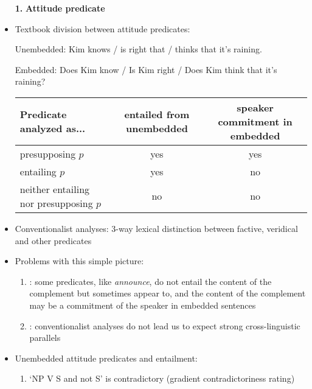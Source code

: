 \documentclass[11pt,fleqn]{article}
\newcommand{\6}{\mbox{$[\hspace*{-.6mm}[$}}
\newcommand{\9}{\mbox{$]\hspace*{-.6mm}]$}}
\begin{document}
\begin{itemize}[leftmargin=3ex,topsep=0pt,itemsep=-2pt]
\newpage

\item[{\bf 1.}] {\bf Attitude predicate}

\item Textbook division between attitude predicates:

\begin{exe}
\ex
\begin{xlist}
\ex Unembedded: Kim knows / is right that / thinks that it's raining.

\ex Embedded: Does Kim know / Is Kim right / Does Kim think that it's raining? 

\end{xlist}
\end{exe}

\begin{tabular}{l|cc}
Predicate analyzed as... & entailed from unembedded & speaker commitment in embedded \\ \hline
presupposing $p$ & yes & yes \\
entailing $p$  & yes & no \\
neither entailing nor presupposing $p$ & no & no \\
\end{tabular}

\item Conventionalist analyses: 3-way lexical distinction between factive, veridical and other predicates

\item Problems with this simple picture:

\begin{enumerate}

\item \citealt{schlenker10,anand-hacquard2014}: some predicates, like {\em announce}, do not entail the content of the complement but sometimes appear to, and the content of the complement may be a commitment of the speaker in embedded sentences

\item \citealt{tonhauser-guarani-variability}: conventionalist analyses do not lead us to expect strong cross-linguistic parallels 

\end{enumerate}

\item Unembedded attitude predicates and entailment:

\begin{enumerate}

\item `NP V S and not S' is contradictory (gradient contradictoriness rating)


\end{enumerate}
\end{itemize}
\end{document}
